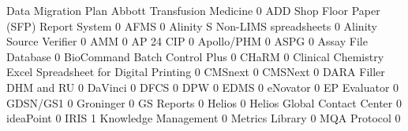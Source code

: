 \documentclass{article}
\begin{document}
\begin{Schunk}
\begin{Soutput}
                                                            Data Migration Plan
  Abbott Transfusion Medicine                                                 0
  ADD Shop Floor Paper (SFP) Report System                                    0
  AFMS                                                                        0
  Alinity S Non-LIMS spreadsheets                                             0
  Alinity Source Verifier                                                     0
  AMM                                                                         0
  AP 24 CIP                                                                   0
  Apollo/PHM                                                                  0
  ASPG                                                                        0
  Assay File Database                                                         0
  BioCommand Batch Control Plus                                               0
  CHaRM                                                                       0
  Clinical Chemistry Excel Spreadsheet for Digital Printing                   0
  CMSnext                                                                     0
  CMSNext                                                                     0
  DARA Filler DHM and RU                                                      0
  DaVinci                                                                     0
  DFCS                                                                        0
  DPW                                                                         0
  EDMS                                                                        0
  eNovator                                                                    0
  EP Evaluator                                                                0
  GDSN/GS1                                                                    0
  Groninger                                                                   0
  GS Reports                                                                  0
  Helios                                                                      0
  Helios Global Contact Center                                                0
  ideaPoint                                                                   0
  IRIS                                                                        1
  Knowledge Management                                                        0
  Metrics Library                                                             0
  MQA Protocol                                                                0

\end{Soutput}
\end{Schunk}
\end{document}
